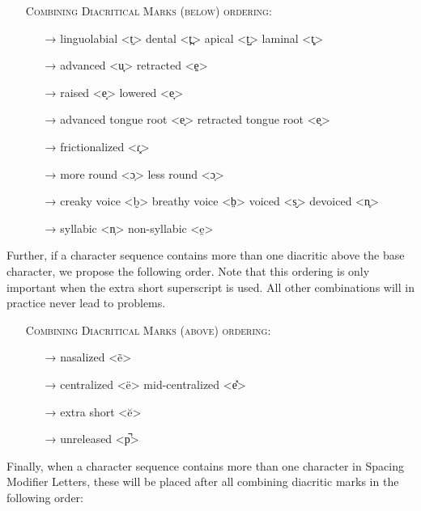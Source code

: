 \begin{itemize}
	\item[] \textsc{Combining Diacritical Marks (below) ordering:}
	\begin{itemize}	
	  \item[→] linguolabial <t̼> \textbar{} dental <t̪> \textbar{} apical <t̺> \textbar{} laminal <t̻>
	  \item[→] advanced <u̟> \textbar{} retracted <e̠> 
	  \item[→] raised <e̝> \textbar{} lowered <e̞>
	  \item[→] advanced tongue root <e̘> \textbar{} retracted tongue root <e̙>
	  \item[→] frictionalized <ɾ͓>
	  \item[→] more round <ɔ̹> \textbar{} less round <ɔ̜>
	  \item[→] creaky voice <b̰> \textbar{} breathy voice <b̤> \textbar{} voiced <s̬> \textbar{} devoiced <n̥>
	  \item[→] syllabic <n̩> \textbar{} non-syllabic <e̯>
	\end{itemize}
 \end{itemize}

Further, if a character sequence contains more than one diacritic above the base
character, we propose the following order. Note that this ordering is only
important when the extra short superscript is used. All other combinations will 
in practice never lead to problems.

\begin{itemize}
	\item[] \textsc{Combining Diacritical Marks (above) ordering:}
	\begin{itemize}
	  \item[→] nasalized <ẽ>
	  \item[→] centralized <ë> \textbar{} mid-centralized <e̽>
	  \item[→] extra short <ĕ>
	  \item[→] unreleased <p̚>
 \end{itemize} \end{itemize}

Finally, when a character sequence contains more than one character in Spacing
Modifier Letters, these will be placed after all combining diacritic marks in the
following order:

